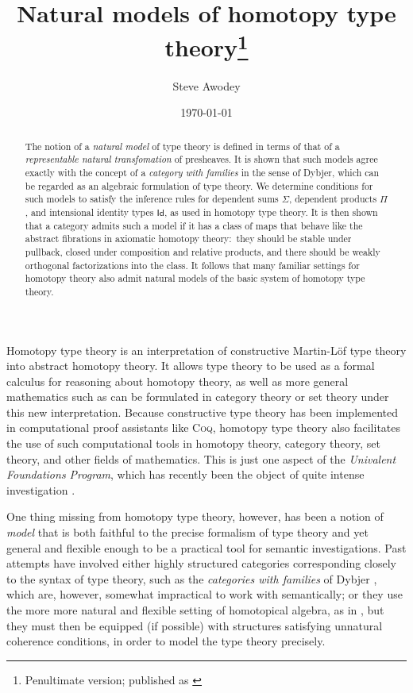 \documentclass[12pt]{article}
\newcommand{\Id}{\mathsf{Id}}
\theoremstyle{definition}
\begin{document}

\title{Natural models of homotopy type theory\thanks{
Penultimate version; published as \cite{awodeyNatural}}}
\author{Steve Awodey}
\date{\today}

\maketitle

\begin{abstract}
\noindent The notion of a \emph{natural model} of type theory is defined in terms of that of a \emph{representable natural transfomation} of presheaves.  It is shown that such models agree exactly with the concept of a \emph{category with families} in the sense of Dybjer, which can be regarded as an algebraic formulation of type theory.  We determine conditions for such models to satisfy the inference rules for dependent sums $\Sigma$, dependent products $\Pi$, and intensional identity types $\Id$, as used in homotopy type theory.  It is then shown that a category admits such a model if it has a class of maps that behave like the abstract fibrations in axiomatic homotopy theory:\ they should be stable under pullback, closed under composition and relative products, and there should be weakly orthogonal factorizations into the class.  It follows that many familiar settings for homotopy theory also admit natural models of the basic system of homotopy type theory.
\end{abstract}


\noindent Homotopy type theory is an interpretation of constructive Martin-L\"of type theory \cite{ML}  into abstract homotopy theory.  It allows type theory to be used as a formal calculus for reasoning about homotopy theory, as well as more general mathematics such as can be formulated in category theory or set theory under this new interpretation.  Because constructive type theory has been implemented in computational proof assistants like \textsc{Coq}, homotopy type theory also facilitates the use of such computational tools in homotopy theory, category theory, set theory, and other fields of mathematics.  This is just one aspect of the \emph{Univalent Foundations Program}, which has recently been the object of quite intense investigation \cite{HoTTbook}.

One thing missing from homotopy type theory, however, has been a notion of \emph{model} that is both faithful to the precise formalism of type theory and yet general and flexible enough to be a practical tool for semantic investigations.  Past attempts have involved either highly structured categories corresponding closely to the syntax of type theory, such as the \emph{categories with families} of Dybjer \cite{CwF}, which are, however, somewhat impractical to work with semantically; or they use the more more natural and flexible setting of homotopical algebra, as in \cite{AW,GvdB}, but they must then be equipped (if possible) with structures satisfying unnatural coherence conditions, in order to model the type theory precisely.
\end{document}

